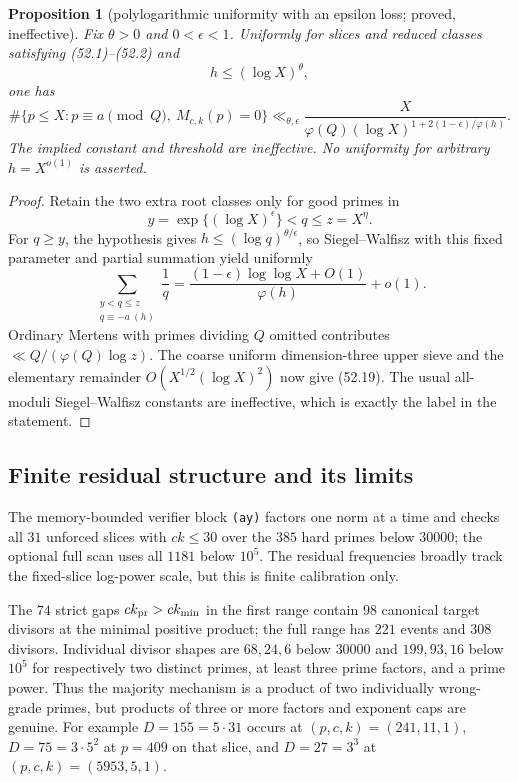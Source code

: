 \documentclass[10pt,reqno]{amsart}
\newtheorem{proposition}[theorem]{Proposition}
\theoremstyle{definition}
\newcommand{\1}{\mathbf 1}
\begin{document}
\begin{proposition}[polylogarithmic uniformity with an epsilon loss; proved,
ineffective]\label{prop:slice-uniform}
Fix $\theta>0$ and $0<\epsilon<1$.  Uniformly for slices and reduced classes
satisfying (52.1)--(52.2) and
\begin{equation}\tag{52.18}
                             h\leq(\log X)^\theta,
\end{equation}
one has
\begin{equation}\tag{52.19}
 \#\{p\leq X:p\equiv a\pmod Q,\ M_{c,k}(p)=0\}
 \ll_{\theta,\epsilon}
 \frac X{\varphi(Q)(\log X)^{1+2(1-\epsilon)/\varphi(h)}}.
\end{equation}
The implied constant and threshold are ineffective.  No uniformity for
arbitrary $h=X^{o(1)}$ is asserted.
\end{proposition}
\begin{proof}
Retain the two extra root classes only for good primes in
\begin{equation}\tag{52.20}
 y=\exp\{(\log X)^\epsilon\}<q\leq z=X^\eta.
\end{equation}
For $q\geq y$, the hypothesis gives
$h\leq(\log q)^{\theta/\epsilon}$, so Siegel--Walfisz with this fixed
parameter and partial summation yield uniformly
\begin{equation}\tag{52.21}
 \sum_{\substack{y<q\leq z\\q\equiv-a\ (h)}}\frac1q
 =\frac{(1-\epsilon)\log\log X+O(1)}{\varphi(h)}+o(1).
\end{equation}
Ordinary Mertens with primes dividing $Q$ omitted contributes
$\ll Q/(\varphi(Q)\log z)$.  The coarse uniform dimension-three upper
sieve and the elementary remainder $O(X^{1/2}(\log X)^2)$ now give
(52.19).  The usual all-moduli Siegel--Walfisz constants are ineffective,
which is exactly the label in the statement.
\end{proof}

\subsection{Finite residual structure and its limits}
The memory-bounded verifier block \texttt{(ay)} factors one norm at a time
and checks all $31$ unforced slices with $ck\leq30$ over the $385$ hard
primes below $30000$; the optional full scan uses all $1181$ below $10^5$.
The residual frequencies broadly track the fixed-slice log-power scale, but
this is finite calibration only.

The $74$ strict gaps $ck_{\rm pr}>ck_{\min}$ in the first range contain
$98$ canonical target divisors at the minimal positive product; the full
range has $221$ events and $308$ divisors.  Individual divisor shapes are
$68,24,6$ below $30000$ and $199,93,16$ below $10^5$ for respectively two
distinct primes, at least three prime factors, and a prime power.  Thus the
majority mechanism is a product of two individually wrong-grade primes,
but products of three or more factors and exponent caps are genuine.  For
example $D=155=5\cdot31$ occurs at $(p,c,k)=(241,11,1)$, $D=75=3\cdot5^2$
at $p=409$ on that slice, and $D=27=3^3$ at
$(p,c,k)=(5953,5,1)$.
\end{document}
